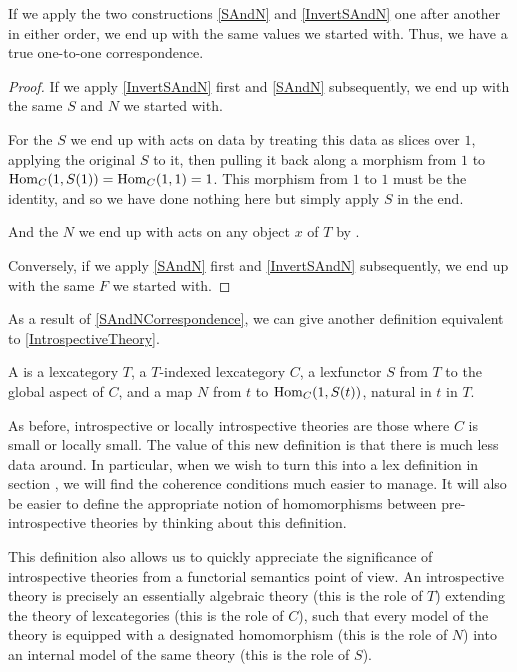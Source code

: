 \begin{theorem}\label{SAndNCorrespondence}
If we apply the two constructions \cref{SAndN} and \cref{InvertSAndN} one after another in either order, we end up with the same values we started with. Thus, we have a true one-to-one correspondence.
\end{theorem}
\begin{proof}
If we apply \cref{InvertSAndN} first and \cref{SAndN} subsequently, we end up with the same $S$ and $N$ we started with.

For the $S$ we end up with acts on data by treating this data as slices over $1$, applying the original $S$ to it, then pulling it back along a morphism from $1$ to $\mathrm{Hom}_C(1, S(1)) = \mathrm{Hom}_C(1, 1) = 1$. This morphism from $1$ to $1$ must be the identity, and so we have done nothing here but simply apply $S$ in the end.

And the $N$ we end up with acts on any object $x$ of $T$ by \TODO.

Conversely, if we apply \cref{SAndN} first and \cref{InvertSAndN} subsequently, we end up with the same $F$ we started with. \TODO
\end{proof}

As a result of \cref{SAndNCorrespondence}, we can give another definition equivalent to \cref{IntrospectiveTheory}.

\begin{definition}\label{IntrospectiveTheoryNS}
A  is a lexcategory $T$, a $T$-indexed lexcategory $C$, a lexfunctor $S$ from $T$ to the global aspect of $C$, and a map $N$ from $t$ to $\mathrm{Hom}_C(1, S(t))$, natural in $t$ in $T$.
\end{definition}

As before, introspective or locally introspective theories are those where $C$ is small or locally small. The value of this new definition is that there is much less data around. In particular, when we wish to turn this into a lex definition in section \TODO, we will find the coherence conditions much easier to manage. It will also be easier to define the appropriate notion of homomorphisms between pre-introspective theories by thinking about this definition.

This definition also allows us to quickly appreciate the significance of introspective theories from a functorial semantics point of view. An introspective theory is precisely an essentially algebraic theory (this is the role of $T$) extending the theory of lexcategories (this is the role of $C$), such that every model of the theory is equipped with a designated homomorphism (this is the role of $N$) into an internal model of the same theory (this is the role of $S$).